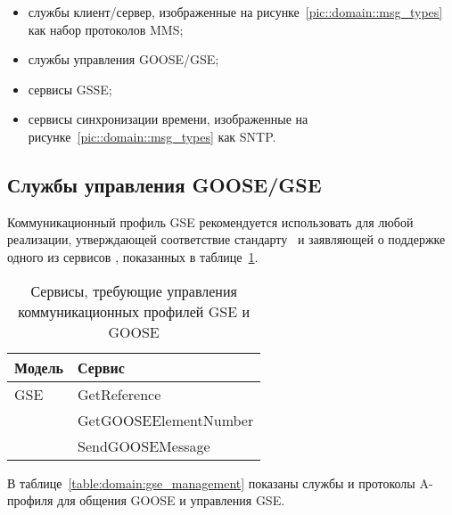 \begin{itemize}
    \item службы клиент/сервер, изображенные на рисунке~\ref{pic::domain::msg_types} как набор протоколов MMS;
    \item службы управления GOOSE/GSE;
    \item сервисы GSSE;
    \item сервисы синхронизации времени, изображенные на рисунке~\ref{pic::domain::msg_types} как SNTP.
\end{itemize}


\subsection{Службы управления GOOSE/GSE}

Коммуникационный профиль GSE рекомендуется использовать для любой реализации,
утверждающей соответствие стандарту \ и заявляющей
о поддержке одного из сервисов , показанных
в таблице~\ref{table:domain:management_services}.

\begin{table}[ht]
    \caption{Сервисы, требующие управления коммуникационных профилей GSE и GOOSE}
    \label{table:domain:management_services}
    \begin{tabular}{| >{\raggedright}m{}
                    | >{\raggedright\arraybackslash}m{}|}
        \hline
        \centering Модель & \centering\arraybackslash Сервис \iecStdRef72 \\

        \hline
        GSE & GetReference \\

         & GetGOOSEElementNumber \\

         & SendGOOSEMessage \\

        \hline
    \end{tabular}
\end{table}

В таблице~\ref{table:domain:gse_management} показаны службы и протоколы A-профиля
для общения GOOSE и управления GSE.

